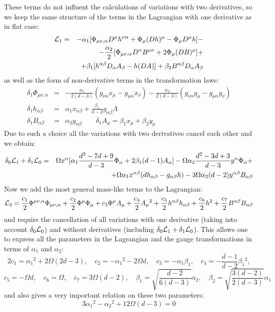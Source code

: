 \documentclass[a4paper,12pt]{article}
\begin{document}
These terms do not influent the calculations of variations with two
derivatives, so we keep the same structure of the terms in the Lagrangian
with one derivative as in flat case:
\begin{eqnarray}
{\cal L}_1 &=& - \alpha_1 [ \Phi_{\mu\nu,\alpha} D^\mu h^{\nu\alpha}
+ \Phi_\mu (D h)^\mu - \Phi_\mu D^\mu h ] - \nonumber \\
 && - \frac{\alpha_2}{2} [ \Phi_{\mu\nu,\alpha} D^\alpha B^{\mu\nu} +
 2 \Phi_\mu (D B)^\mu ] + \nonumber \\
 && + \beta_1 [ h^{\alpha\beta} D_\alpha A_\beta - h (D A) ] +
 \beta_2 B^{\alpha\beta} D_\alpha A_\beta
\end{eqnarray}
as well as the form of non-derivative terms in the transformation laws:
\begin{eqnarray}
\delta_1 \Phi_{\mu\nu,\alpha} &=& - \frac{\alpha_1}{2(d-3)} ( g_{\nu\alpha}
x_\mu - g_{\mu\alpha} x_\nu) - \frac{\alpha_2}{2(d-3)} ( g_{\nu\alpha}
y_\mu - g_{\mu\alpha} y_\nu) \nonumber \\
\delta_1 h_{\alpha\beta} &=& \alpha_1 x_{\alpha\beta} + \frac{\beta_1}{d-2}
g_{\alpha\beta} \Lambda \\
\delta_1 B_{\alpha\beta} &=& \alpha_2 y_{\alpha\beta} \qquad \delta_1 A_\mu
= \beta_1 x_\mu + \beta_2 y_\mu \nonumber
\end{eqnarray}
Due to such a choice all the variations with two derivatives cancel each
other and we obtain:
\begin{eqnarray}
\delta_0 {\cal L}_1 + \delta_1 {\cal L}_0 &=& \Omega x^\alpha [ \alpha_1
\frac{d^2-7d +9}{d-3} \Phi_\alpha + 2 \beta_1 (d-1) A_\alpha ] -
\Omega \alpha_2 \frac{d^2-3d+3}{d-3} y^\alpha \Phi_\alpha + \nonumber \\
 && + \Omega \alpha_1 x^{\alpha\beta} (d h_{\alpha\beta} - g_{\alpha\beta} h)
- 3 \Omega \alpha_2 (d-2) y^{\alpha\beta} B_{\alpha\beta}
\end{eqnarray}
Now we add the most general mass-like terms to the Lagrangian:
\begin{equation}
{\cal L}_2 = \frac{c_1}{2} \Phi^{\mu\nu,\alpha} \Phi_{\mu\nu,\alpha}
+ \frac{c_2}{2} \Phi^\mu \Phi_\mu + c_3 \Phi^\mu A_\mu + \frac{c_4}{2}
A_\mu{}^2 + \frac{c_5}{2} h^{\alpha\beta} h_{\alpha\beta} +
\frac{c_6}{2} h^2 + \frac{c_7}{2} B^{\alpha\beta} B_{\alpha\beta}
\end{equation}
and require the cancellation of all variations with one derivative
(taking into account $\delta_0 {\cal L}_0$) and without derivatives
(including $\delta_0 {\cal L}_1 + \delta_1 {\cal L}_0$). This allows one
to express all the parameters in the Lagrangian and the gauge
transformations in terms of $\alpha_1$ and $\alpha_2$:
$$
2c_1 = \alpha_1{}^2 + 2 \Omega(2d-3), \quad
c_2 = - \alpha_1{}^2 - 2 \Omega d, \quad
c_3 = - \alpha_1 \beta_1, \quad c_4 = - \frac{d-1}{d-2} \beta_1{}^2,
$$
$$
c_5 = - \Omega d, \quad c_6 = \Omega, \quad c_7 = 3 \Omega (d-2), \quad
\beta_1 = \sqrt{\frac{d-2}{6(d-3)}} \alpha_2, \quad
\beta_2 = \sqrt{\frac{3(d-2)}{2(d-3)}} \alpha_1
$$
and also gives a very important relation on these two parameters:
\begin{equation}
3 \alpha_1{}^2 - \alpha_2{}^2 + 12 \Omega (d-3) = 0
\end{equation}
\end{document}
